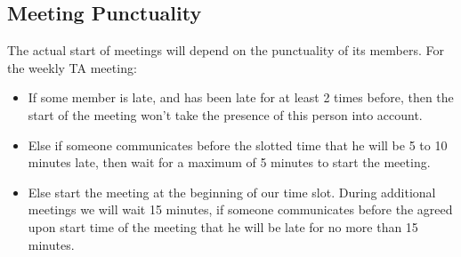 \subsection{Meeting Punctuality}
The actual start of meetings will depend on the punctuality of its members.
For the weekly TA meeting:
\begin{itemize}
    \item If some member is late, and has been late for at least 2 times before, then the start of the meeting won’t take the presence of this person into account.
    \item Else if someone communicates before the slotted time that he will be 5 to 10 minutes late, then wait for a maximum of 5 minutes to start the meeting.
    \item Else start the meeting at the beginning of our time slot.
During additional meetings we will wait 15 minutes, if someone communicates before the agreed upon start time of the meeting that he will be late for no more than 15 minutes.
\end{itemize}